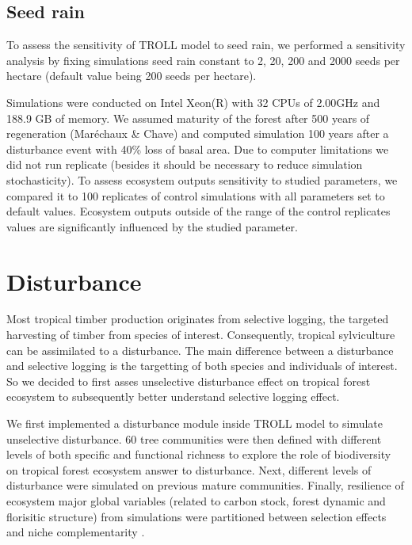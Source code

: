 \documentclass[]{article}
\let\oldsection\section
\renewcommand\section{\newpage\oldsection}
\theoremstyle{definition}
\theoremstyle{definition}
\theoremstyle{remark}
\begin{document}
\subsection{Seed rain}\label{seed-rain}

To assess the sensitivity of TROLL model to seed rain, we performed a
sensitivity analysis by fixing simulations seed rain constant to 2, 20,
200 and 2000 seeds per hectare (default value being 200 seeds per
hectare).

Simulations were conducted on Intel Xeon(R) with 32 CPUs of 2.00GHz and
188.9 GB of memory. We assumed maturity of the forest after 500 years of
regeneration (Maréchaux \& Chave) and computed simulation 100 years
after a disturbance event with 40\% loss of basal area. Due to computer
limitations we did not run replicate (besides it should be necessary to
reduce simulation stochasticity). To assess ecosystem outputs
sensitivity to studied parameters, we compared it to 100 replicates of
control simulations with all parameters set to default values. Ecosystem
outputs outside of the range of the control replicates values are
significantly influenced by the studied parameter.

\section{Disturbance}\label{disturbance}

Most tropical timber production originates from selective logging, the
targeted harvesting of timber from species of interest. Consequently,
tropical sylviculture can be assimilated to a disturbance. The main
difference between a disturbance and selective logging is the targetting
of both species and individuals of interest. So we decided to first
asses unselective disturbance effect on tropical forest ecosystem to
subsequently better understand selective logging effect.

We first implemented a disturbance module inside TROLL model to simulate
unselective disturbance. 60 tree communities were then defined with
different levels of both specific and functional richness to explore the
role of biodiversity on tropical forest ecosystem answer to disturbance.
Next, different levels of disturbance were simulated on previous mature
communities. Finally, resilience of ecosystem major global variables
(related to carbon stock, forest dynamic and florisitic structure) from
simulations were partitioned between selection effects and niche
complementarity \citep{Loreau2001}.
\end{document}
